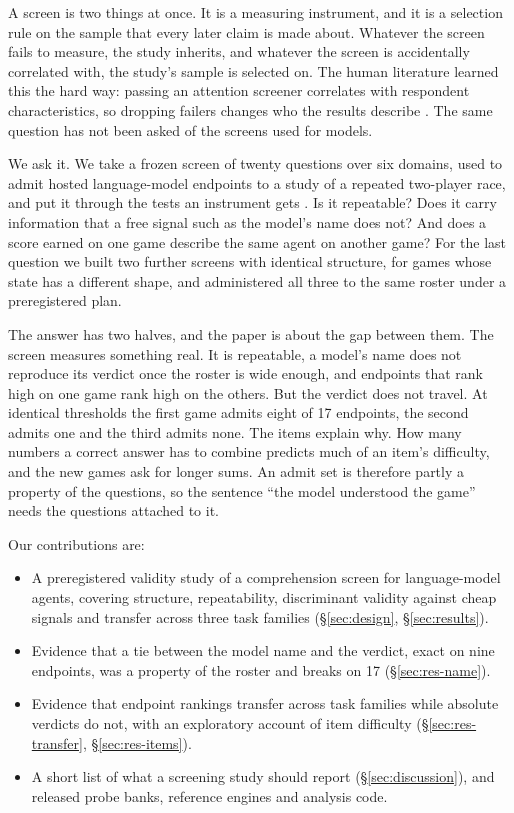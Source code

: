 \documentclass[11pt]{article}
\begin{document}
A screen is two things at once. It is a measuring instrument, and it is a
selection rule on the sample that every later claim is made about. Whatever
the screen fails to measure, the study inherits, and whatever the screen is
accidentally correlated with, the study's sample is selected on. The human
literature learned this the hard way: passing an attention screener correlates
with respondent characteristics, so dropping failers changes who the results
describe \citep{berinsky2014separating,aronow2019note}. The same question has
not been asked of the screens used for models.

We ask it. We take a frozen screen of twenty questions over six domains, used
to admit hosted language-model endpoints to a study of a repeated two-player
race, and put it through the tests an instrument gets
\citep{wallach2025position,salaudeen2025measurement}. Is it repeatable? Does it
carry information that a free signal such as the model's name does not? And
does a score earned on one game describe the same agent on another game? For
the last question we built two further screens with identical structure, for
games whose state has a different shape, and administered all three to the same
roster under a preregistered plan.

The answer has two halves, and the paper is about the gap between them. The
screen measures something real. It is repeatable, a model's name does not
reproduce its verdict once the roster is wide enough, and endpoints that rank
high on one game rank high on the others. But the verdict does not travel. At
identical thresholds the first game admits eight of 17 endpoints, the second
admits one and the third admits none. The items explain why. How many numbers a
correct answer has to combine predicts much of an item's difficulty, and the
new games ask for longer sums. An admit set is therefore partly a
property of the questions, so the sentence ``the model understood the game''
needs the questions attached to it.

Our contributions are:
\begin{itemize}
\item A preregistered validity study of a comprehension screen for
      language-model agents, covering structure, repeatability, discriminant
      validity against cheap signals and transfer across three task families
      (\S\ref{sec:design}, \S\ref{sec:results}).
\item Evidence that a tie between the model name and the verdict, exact on
      nine endpoints, was a property of the roster and breaks on 17
      (\S\ref{sec:res-name}).
\item Evidence that endpoint rankings transfer across task families while
      absolute verdicts do not, with an exploratory account of item difficulty
      (\S\ref{sec:res-transfer}, \S\ref{sec:res-items}).
\item A short list of what a screening study should report
      (\S\ref{sec:discussion}), and released probe banks, reference engines
      and analysis code.
\end{itemize}
\end{document}

